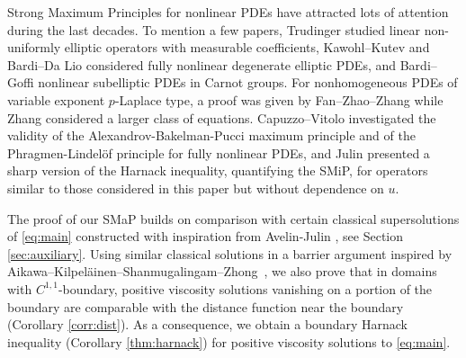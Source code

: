 \documentclass[12pt]{article}
\numberwithin{komcounter}{section}
\begin{document}
Strong Maximum Principles for nonlinear PDEs have attracted lots of attention during the last decades.
To mention a few papers,
%
Trudinger \cite{T77} studied linear non-uniformly elliptic operators with measurable coefficients,
%
Kawohl--Kutev \cite{KK98} and Bardi--Da Lio \cite{BD99} considered fully nonlinear degenerate elliptic PDEs, %
%
%
and Bardi--Goffi \cite{BG19} nonlinear subelliptic
PDEs in Carnot groups. %
%
For nonhomogeneous PDEs of variable exponent $p$-Laplace type, a proof was given by
Fan--Zhao--Zhang \cite{FZZ03} while Zhang \cite{Z05} considered a larger class of equations.
%
Capuzzo--Vitolo \cite{CV07} investigated the validity of the Alexandrov-Bakelman-Pucci maximum principle and of the Phragmen-Lindel\"of principle for fully nonlinear PDEs,
and
Julin \cite{J13} presented a sharp version of the Harnack inequality, quantifying the SMiP, for operators similar to those considered in this paper but without dependence on $u$.

The proof of our SMaP builds on comparison %
with certain classical supersolutions of \eqref{eq:main} constructed  with inspiration from Avelin-Julin \cite{AJ17}, see Section \ref{sec:auxiliary}.
%
%
Using similar classical solutions in a barrier argument inspired by Aikawa--Kilpel\"ainen--Shanmugalingam--Zhong~\cite{AKSZ07}, we also prove that in domains with $C^{1,1}$-boundary,
positive viscosity solutions vanishing on a portion of the boundary are comparable with
the distance function near the boundary (Corollary \ref{corr:dist}).
As a consequence, we obtain a boundary Harnack inequality
(Corollary \ref{thm:harnack}) for positive viscosity solutions to \eqref{eq:main}.
\end{document}
